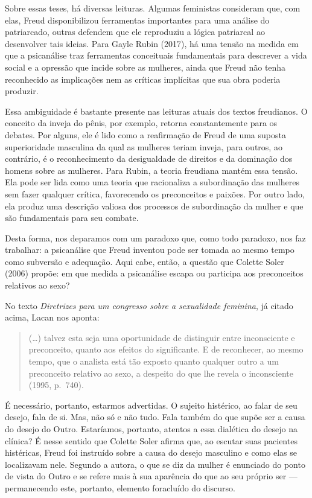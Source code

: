 Sobre essas teses, há diversas leituras. Algumas feministas consideram
que, com elas, Freud disponibilizou ferramentas importantes para uma
análise do patriarcado, outras defendem que ele reproduziu a lógica
patriarcal ao desenvolver tais ideias. Para Gayle Rubin (2017), há uma
tensão na medida em que a psicanálise traz ferramentas conceituais
fundamentais para descrever a vida social e a opressão que incide sobre
as mulheres, ainda que Freud não tenha reconhecido as implicações nem as
críticas implícitas que sua obra poderia produzir.

Essa ambiguidade é bastante presente nas leituras atuais dos textos
freudianos. O conceito da inveja do pênis, por exemplo, retorna
constantemente para os debates. Por alguns, ele é lido como a
reafirmação de Freud de uma suposta superioridade masculina da qual as
mulheres teriam inveja, para outros, ao contrário, é o reconhecimento da
desigualdade de direitos e da dominação dos homens sobre as mulheres.
Para Rubin, a teoria freudiana mantém essa tensão. Ela pode ser lida
como uma teoria que racionaliza a subordinação das mulheres sem fazer
qualquer crítica, favorecendo os preconceitos e paixões. Por outro lado,
ela produz uma descrição valiosa dos processos de subordinação da mulher
e que são fundamentais para seu combate.

Desta forma, nos deparamos com um paradoxo que, como todo paradoxo, nos
faz trabalhar: a psicanálise que Freud inventou pode ser tomada ao mesmo
tempo como subversão e adequação. Aqui cabe, então, a questão que
Colette Soler (2006) propõe: em que medida a psicanálise escapa ou
participa aos preconceitos relativos ao sexo?

No texto \emph{Diretrizes para um congresso sobre a sexualidade
feminina}, já citado acima, Lacan nos aponta:

\begin{quote}
(\ldots{}) talvez esta seja uma oportunidade de distinguir entre inconsciente
e preconceito, quanto aos efeitos do significante. E de reconhecer, ao
mesmo tempo, que o analista está tão exposto quanto qualquer outro a um
preconceito relativo ao sexo, a despeito do que lhe revela o
inconsciente (1995, p.~740).
\end{quote}

É necessário, portanto, estarmos advertidas. O sujeito histérico, ao
falar de seu desejo, fala de si. Mas, não só e não tudo. Fala também do
que supõe ser a causa do desejo do Outro. Estaríamos, portanto, atentos
a essa dialética do desejo na clínica? É nesse sentido que Colette Soler
afirma que, ao escutar suas pacientes histéricas, Freud foi
instruído sobre a causa do desejo masculino e como elas se localizavam
nele. Segundo a autora, o que se diz da mulher é enunciado do ponto de
vista do Outro e se refere mais à sua aparência do que ao seu próprio
ser --- permanecendo este, portanto, elemento foracluído do discurso.

